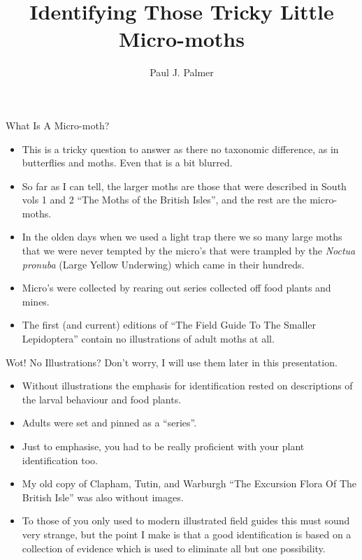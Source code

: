 \documentclass[
  ignorenonframetext,
]{beamer}
\title{Identifying Those Tricky Little Micro-moths}
\author{Paul J. Palmer}
\date{}
\providecommand{\tightlist}{%
  \setlength{\itemsep}{0pt}\setlength{\parskip}{0pt}}
\begin{document}
\frame{\titlepage}

\begin{frame}{What Is A Micro-moth?}
\protect\hypertarget{what-is-a-micro-moth}{}
\begin{itemize}
\tightlist
\item
  This is a tricky question to answer as there no taxonomic difference,
  as in butterflies and moths. Even that is a bit blurred.
\item
  So far as I can tell, the larger moths are those that were described
  in South vols 1 and 2 ``The Moths of the British Isles'', and the rest
  are the micro-moths.
\item
  In the olden days when we used a light trap there we so many large
  moths that we were never tempted by the micro's that were trampled by
  the \emph{Noctua pronuba} (Large Yellow Underwing) which came in their
  hundreds.
\item
  Micro's were collected by rearing out series collected off food plants
  and mines.
\item
  The first (and current) editions of ``The Field Guide To The Smaller
  Lepidoptera'' contain no illustrations of adult moths at all.
\end{itemize}
\end{frame}

\begin{frame}{Wot! No Illustrations?}
\protect\hypertarget{wot-no-illustrations}{}
Don't worry, I will use them later in this presentation.

\begin{itemize}
\tightlist
\item
  Without illustrations the emphasis for identification rested on
  descriptions of the larval behaviour and food plants.
\item
  Adults were set and pinned as a ``series''.
\item
  Just to emphasise, you had to be really proficient with your plant
  identification too.
\item
  My old copy of Clapham, Tutin, and Warburgh ``The Excursion Flora Of
  The British Isle'' was also without images.
\item
  To those of you only used to modern illustrated field guides this must
  sound very strange, but the point I make is that a good identification
  is based on a collection of evidence which is used to eliminate all
  but one possibility.
\end{itemize}
\end{frame}
\end{document}
